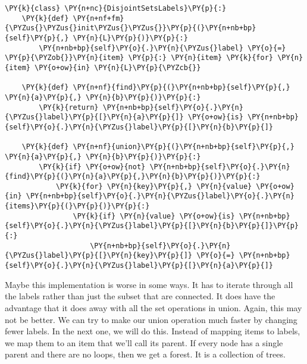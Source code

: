 \begin{Verbatim}[commandchars=\\\{\}]
\PY{k}{class} \PY{n+nc}{DisjointSetsLabels}\PY{p}{:}
    \PY{k}{def} \PY{n+nf+fm}{\PYZus{}\PYZus{}init\PYZus{}\PYZus{}}\PY{p}{(}\PY{n+nb+bp}{self}\PY{p}{,} \PY{n}{L}\PY{p}{)}\PY{p}{:}
        \PY{n+nb+bp}{self}\PY{o}{.}\PY{n}{\PYZus{}label} \PY{o}{=} \PY{p}{\PYZob{}}\PY{n}{item} \PY{p}{:} \PY{n}{item} \PY{k}{for} \PY{n}{item} \PY{o+ow}{in} \PY{n}{L}\PY{p}{\PYZcb{}}

    \PY{k}{def} \PY{n+nf}{find}\PY{p}{(}\PY{n+nb+bp}{self}\PY{p}{,} \PY{n}{a}\PY{p}{,} \PY{n}{b}\PY{p}{)}\PY{p}{:}
        \PY{k}{return} \PY{n+nb+bp}{self}\PY{o}{.}\PY{n}{\PYZus{}label}\PY{p}{[}\PY{n}{a}\PY{p}{]} \PY{o+ow}{is} \PY{n+nb+bp}{self}\PY{o}{.}\PY{n}{\PYZus{}label}\PY{p}{[}\PY{n}{b}\PY{p}{]}

    \PY{k}{def} \PY{n+nf}{union}\PY{p}{(}\PY{n+nb+bp}{self}\PY{p}{,} \PY{n}{a}\PY{p}{,} \PY{n}{b}\PY{p}{)}\PY{p}{:}
        \PY{k}{if} \PY{o+ow}{not} \PY{n+nb+bp}{self}\PY{o}{.}\PY{n}{find}\PY{p}{(}\PY{n}{a}\PY{p}{,}\PY{n}{b}\PY{p}{)}\PY{p}{:}
            \PY{k}{for} \PY{n}{key}\PY{p}{,} \PY{n}{value} \PY{o+ow}{in} \PY{n+nb+bp}{self}\PY{o}{.}\PY{n}{\PYZus{}label}\PY{o}{.}\PY{n}{items}\PY{p}{(}\PY{p}{)}\PY{p}{:}
                \PY{k}{if} \PY{n}{value} \PY{o+ow}{is} \PY{n+nb+bp}{self}\PY{o}{.}\PY{n}{\PYZus{}label}\PY{p}{[}\PY{n}{b}\PY{p}{]}\PY{p}{:}
                    \PY{n+nb+bp}{self}\PY{o}{.}\PY{n}{\PYZus{}label}\PY{p}{[}\PY{n}{key}\PY{p}{]} \PY{o}{=} \PY{n+nb+bp}{self}\PY{o}{.}\PY{n}{\PYZus{}label}\PY{p}{[}\PY{n}{a}\PY{p}{]}
\end{Verbatim}



Maybe this implementation is worse in some ways. It has to iterate through all the labels rather than just the subset that are connected.
It does have the advantage that it does away with all the set operations in union. Again, this may not be better.
We can try to make our union operation much faster by changing fewer labels. In the next one, we will do this.
Instead of mapping items to labels, we map them to an item that we'll call its parent.
If every node has a single parent and there are no loops, then we get a forest. It is a collection of trees.

